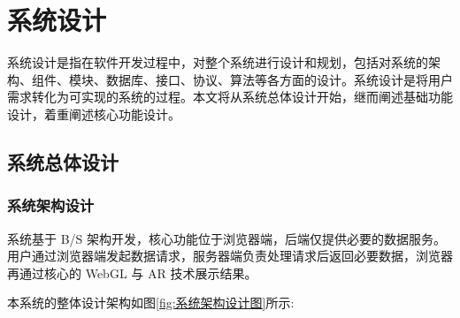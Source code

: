 \section{系统设计}

系统设计是指在软件开发过程中，对整个系统进行设计和规划，包括对系统的架构、组件、模块、数据库、接口、协议、算法等各方面的设计。系统设计是将用户需求转化为可实现的系统的过程。本文将从系统总体设计开始，继而阐述基础功能设计，着重阐述核心功能设计。

\subsection{系统总体设计}

\subsubsection{系统架构设计}

系统基于 B/S 架构开发，核心功能位于浏览器端，后端仅提供必要的数据服务。用户通过浏览器端发起数据请求，服务器端负责处理请求后返回必要数据，浏览器再通过核心的 WebGL 与 AR 技术展示结果。

本系统的整体设计架构如图\ref{fig:系统架构设计图}所示:

